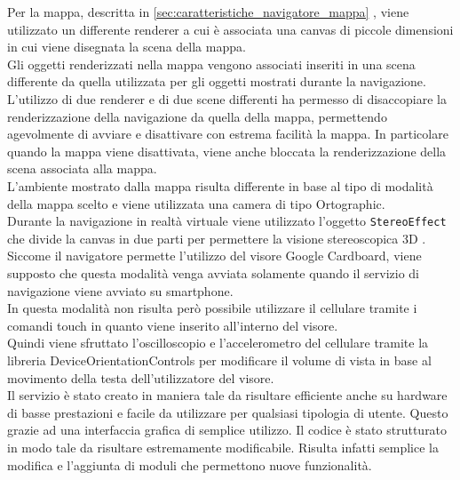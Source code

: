 Per la mappa, descritta in \ref{sec:caratteristiche_navigatore_mappa} , viene utilizzato un differente renderer a cui è associata una canvas di piccole dimensioni in cui viene disegnata la scena della mappa.
\\
Gli oggetti renderizzati nella mappa vengono associati inseriti in una scena differente da quella utilizzata per gli oggetti mostrati durante la navigazione.
\\
L’utilizzo di due renderer e di due scene differenti ha permesso di disaccopiare la renderizzazione della navigazione da quella della mappa, permettendo agevolmente di avviare e disattivare con estrema facilità la mappa. In particolare quando la mappa viene disattivata, viene anche bloccata la renderizzazione della scena associata alla mappa.
\\
L’ambiente mostrato dalla mappa risulta differente in base al tipo di modalità della mappa scelto e viene utilizzata una camera di tipo Ortographic.
\\
Durante la navigazione in realtà virtuale viene utilizzato l’oggetto \texttt{StereoEffect} che divide la canvas in due parti per permettere la visione stereoscopica 3D \cite{stereo_effect}.
Siccome il navigatore permette l’utilizzo del visore Google Cardboard, viene supposto che questa modalità venga avviata solamente quando il servizio di navigazione viene avviato su smartphone.
\\
In questa modalità non risulta però possibile utilizzare il cellulare tramite i comandi touch in quanto viene inserito all’interno del visore.
\\
Quindi viene sfruttato l’oscilloscopio e l’accelerometro del cellulare tramite la libreria DeviceOrientationControls per modificare il volume di vista in base al movimento della testa dell’utilizzatore del visore.
\\

Il servizio è stato creato in maniera tale da risultare efficiente anche su hardware di basse prestazioni e facile da utilizzare per qualsiasi tipologia di utente. Questo grazie ad una interfaccia grafica di semplice utilizzo.
Il codice è stato strutturato in modo tale da risultare estremamente modificabile. Risulta infatti semplice la modifica e l’aggiunta di moduli che permettono nuove funzionalità.

